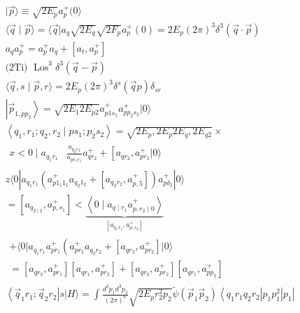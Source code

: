 \documentclass[10pt]{article}
\begin{document}
\[
\begin{aligned}
& |\vec{p}\rangle \equiv \sqrt{2 E_{p}} a_{p}^{+}(0\rangle \\
& \langle\vec{q} \mid \vec{p}\rangle=\langle\vec{q}| a_{q} \sqrt{2 E_{q}} \sqrt{2 F_{p}} a_{p}^{+}(0)=2 E_{p}(2 \pi)^{3} \delta^{3}(\vec{q} \cdot \vec{p}) \\
& a_{q} a_{p}^{+}=a_{p}^{+} a_{q}+\left[a_{t}, a_{p}^{+}\right] \\
& \text {(2Ti) } \operatorname{Los}^{3} \delta^{3}(\vec{q}-\vec{p}) \\
& \langle\vec{q}, s \mid \vec{p}, r\rangle=2 E_{p}(2 \pi)^{3} \delta^{s}(\vec{q} p) \delta_{s r} \\
& \left|\vec{p}_{1, p p_{2}}\right\rangle=\sqrt{2 E_{1} 2 E_{p 2}} a_{p 1 s_{1}}^{+} a_{p p_{2} s_{2}}^{+}|0\rangle \\
& \left\langle q_{1}, r_{1} ; q_{2}, r_{2} \mid p s_{1} ; p_{2} s_{2}\right\rangle=\sqrt{2 E_{p}, 2 E_{p} 2 E_{q}, 2 E_{q 2}} \times \\
& \begin{aligned}
x<0 \mid a_{q_{1} r_{1}} & \frac{a_{q_{2} r_{2}}}{a_{p r_{1} r_{1}}} a_{q r_{2}}^{+}+\left[a_{q r_{2}}, a_{p r_{2}}^{+}|0\rangle\right.
\end{aligned} \\
& z\langle 0| a_{q_{1} r_{1}}\left(a_{p 1_{1} 1_{1}}^{+} a_{q_{2} 1_{2}}+\left[a_{q_{2} r_{2}}, a_{p, 5}^{+}\right]\right) a_{p \delta_{2}}^{+}|0\rangle \\
& =\left[a_{q_{2 \mid 2}}, a_{p, s_{1}}^{+}\right]<\underbrace{\left\langle 0 \mid a_{q \mid r_{1}} a_{p, r_{2} \mid 0}^{+}\right\rangle}_{\left[a_{q, r_{1}}, a_{p, s_{2}}^{+}\right]} \\
& \begin{array}{l}
+\langle 0| a_{q_{1} r_{1}} a_{p r_{1}}^{+}\left(a_{p r_{2}}^{+} a_{q_{2} r_{2}}+\left[a_{q r_{2}}, a_{p r_{2}}^{+}\right]|0\rangle\right. \\
=\left[a_{q r_{2}}, a_{p r_{1}}^{+}\right]\left[a_{q r_{1}}, a_{p r_{2}}^{+}\right]+\left[a_{q r_{2}}, a_{p r_{2}}^{+}\right]\left[a_{q r_{1}}, a_{p p_{2}}^{+}\right]
\end{array} \\
& \left\langle\vec{q}_{1} r_{1} ; \vec{q}_{2} r_{2}\right| s|H\rangle=\int \frac{d^{3} p_{1} d^{3} p_{2}}{(2 \pi)^{6}} \sqrt{2 E_{p} r_{2}^{2} p_{2}} \tilde{\psi}\left(\vec{p}_{1} \vec{p}_{2}\right)\left\langle q_{1} r_{1} q_{2} r_{2}\right| p_{1} p_{1}^{2}\left|p_{1}\right| \\
& \begin{array}{r}

\end{array}
\end{aligned}\]
\end{document}

